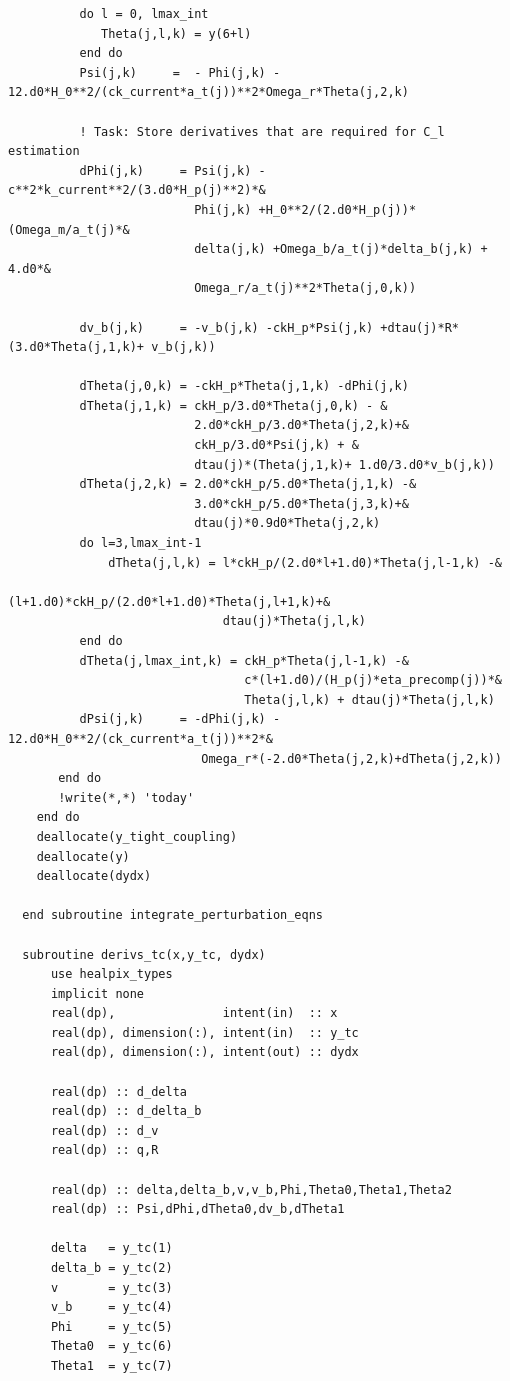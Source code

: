 \documentclass[a4paper]{report}
\begin{document}
\begin{verbatim}
          do l = 0, lmax_int
             Theta(j,l,k) = y(6+l)
          end do
          Psi(j,k)     =  - Phi(j,k) - 12.d0*H_0**2/(ck_current*a_t(j))**2*Omega_r*Theta(j,2,k)

          ! Task: Store derivatives that are required for C_l estimation
          dPhi(j,k)     = Psi(j,k) -c**2*k_current**2/(3.d0*H_p(j)**2)*&
                          Phi(j,k) +H_0**2/(2.d0*H_p(j))*(Omega_m/a_t(j)*&
                          delta(j,k) +Omega_b/a_t(j)*delta_b(j,k) + 4.d0*&
                          Omega_r/a_t(j)**2*Theta(j,0,k))

          dv_b(j,k)     = -v_b(j,k) -ckH_p*Psi(j,k) +dtau(j)*R*(3.d0*Theta(j,1,k)+ v_b(j,k))

          dTheta(j,0,k) = -ckH_p*Theta(j,1,k) -dPhi(j,k)
          dTheta(j,1,k) = ckH_p/3.d0*Theta(j,0,k) - &
                          2.d0*ckH_p/3.d0*Theta(j,2,k)+&
                          ckH_p/3.d0*Psi(j,k) + &
                          dtau(j)*(Theta(j,1,k)+ 1.d0/3.d0*v_b(j,k))
          dTheta(j,2,k) = 2.d0*ckH_p/5.d0*Theta(j,1,k) -&
                          3.d0*ckH_p/5.d0*Theta(j,3,k)+&
                          dtau(j)*0.9d0*Theta(j,2,k)
          do l=3,lmax_int-1
              dTheta(j,l,k) = l*ckH_p/(2.d0*l+1.d0)*Theta(j,l-1,k) -&
                              (l+1.d0)*ckH_p/(2.d0*l+1.d0)*Theta(j,l+1,k)+&
                              dtau(j)*Theta(j,l,k)
          end do
          dTheta(j,lmax_int,k) = ckH_p*Theta(j,l-1,k) -&
                                 c*(l+1.d0)/(H_p(j)*eta_precomp(j))*&
                                 Theta(j,l,k) + dtau(j)*Theta(j,l,k)
          dPsi(j,k)     = -dPhi(j,k) - 12.d0*H_0**2/(ck_current*a_t(j))**2*&
                           Omega_r*(-2.d0*Theta(j,2,k)+dTheta(j,2,k))
       end do
       !write(*,*) 'today'
    end do
    deallocate(y_tight_coupling)
    deallocate(y)
    deallocate(dydx)

  end subroutine integrate_perturbation_eqns

  subroutine derivs_tc(x,y_tc, dydx)
      use healpix_types
      implicit none
      real(dp),               intent(in)  :: x
      real(dp), dimension(:), intent(in)  :: y_tc
      real(dp), dimension(:), intent(out) :: dydx

      real(dp) :: d_delta
      real(dp) :: d_delta_b
      real(dp) :: d_v
      real(dp) :: q,R

      real(dp) :: delta,delta_b,v,v_b,Phi,Theta0,Theta1,Theta2
      real(dp) :: Psi,dPhi,dTheta0,dv_b,dTheta1

      delta   = y_tc(1)
      delta_b = y_tc(2)
      v       = y_tc(3)
      v_b     = y_tc(4)
      Phi     = y_tc(5)
      Theta0  = y_tc(6)
      Theta1  = y_tc(7)


\end{verbatim}
\end{document}
